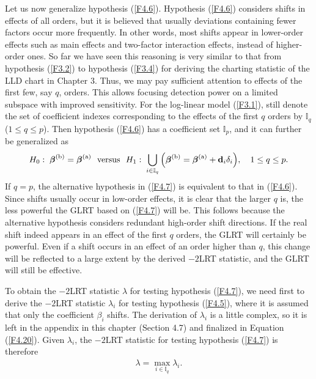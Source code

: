 Let us now generalize hypothesis (\ref{F4.6}). Hypothesis (\ref{F4.6}) considers
shifts in effects of all orders, but it is believed that usually deviations
containing fewer factors occur more frequently. In other words, most shifts appear
in lower-order effects such as main effects and two-factor interaction effects,
instead of higher-order ones. So far we have seen this reasoning is very similar to
that from hypothesis (\ref{F3.2}) to hypothesis (\ref{F3.4}) for deriving the
charting statistic of the LLD chart in Chapter 3. Thus, we may pay sufficient
attention to effects of the first few, say $q$, orders. This allows focusing
detection power on a limited subspace with improved sensitivity. For the log-linear
model (\ref{F3.1}), still denote the set of coefficient indexes corresponding to the
effects of the first $q$ orders by $\mathbb{I}_q$ ($1\leq q\leq p$). Then hypothesis
(\ref{F4.6}) has a coefficient set $\mathbb{I}_p$, and it can further be generalized
as
\begin{align}
H_0:\;\bm{\beta}^{(\mathrm{b})}=\bm{\beta}^{(\mathrm{a})}\ \ \mbox{versus}\ \
H_1:\;\bigcup_{i\in\mathbb{I}_q}\Big(\bm{\beta}^{(\mathrm{b})}=\bm{\beta}^{(\mathrm{a})}+{\bf
d}_i\delta_i\Big),\quad 1\leq q\leq p.\label{F4.7}
\end{align}
If $q=p$, the alternative hypothesis in (\ref{F4.7}) is equivalent to that in
(\ref{F4.6}). Since shifts usually occur in low-order effects, it is clear that the
larger $q$ is, the less powerful the GLRT based on (\ref{F4.7}) will be. This
follows because the alternative hypothesis considers redundant high-order shift
directions. If the real shift indeed appears in an effect of the first $q$ orders,
the GLRT will certainly be powerful. Even if a shift occurs in an effect of an order
higher than $q$, this change will be reflected to a large extent by the derived
$-2$LRT statistic, and the GLRT will still be effective.

To obtain the $-2$LRT statistic $\lambda$ for testing hypothesis (\ref{F4.7}), we
need first to derive the $-2$LRT statistic $\lambda_i$ for testing hypothesis
(\ref{F4.5}), where it is assumed that only the coefficient $\beta_i$ shifts. The
derivation of $\lambda_i$ is a little complex, so it is left in the appendix in this
chapter (Section 4.7) and finalized in Equation (\ref{F4.20}). Given $\lambda_i$,
the $-2$LRT statistic for testing hypothesis (\ref{F4.7}) is therefore
\begin{align}
\lambda=\max_{i\in\mathbb{I}_q}\lambda_i.\label{F4.8}
\end{align}



